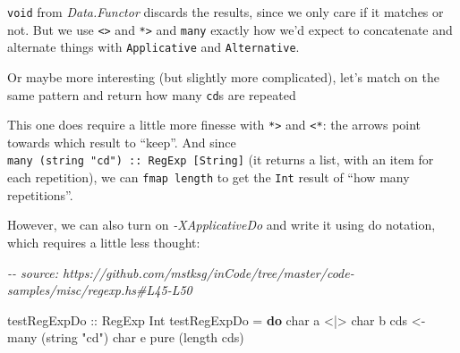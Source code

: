 \documentclass[]{article}
\newenvironment{Shaded}{}{}
\newcommand{\CharTok}[1]{\textcolor[rgb]{0.25,0.44,0.63}{#1}}
\newcommand{\CommentTok}[1]{\textcolor[rgb]{0.38,0.63,0.69}{\textit{#1}}}
\newcommand{\DataTypeTok}[1]{\textcolor[rgb]{0.56,0.13,0.00}{#1}}
\newcommand{\FunctionTok}[1]{\textcolor[rgb]{0.02,0.16,0.49}{#1}}
\newcommand{\KeywordTok}[1]{\textcolor[rgb]{0.00,0.44,0.13}{\textbf{#1}}}
\newcommand{\NormalTok}[1]{#1}
\newcommand{\OperatorTok}[1]{\textcolor[rgb]{0.40,0.40,0.40}{#1}}
\newcommand{\OtherTok}[1]{\textcolor[rgb]{0.00,0.44,0.13}{#1}}
\newcommand{\StringTok}[1]{\textcolor[rgb]{0.25,0.44,0.63}{#1}}
\begin{document}
\texttt{void} from \emph{Data.Functor} discards the results, since we only care
if it matches or not. But we use \texttt{\textless{}\textbar{}\textgreater{}}
and \texttt{*\textgreater{}} and \texttt{many} exactly how we'd expect to
concatenate and alternate things with \texttt{Applicative} and
\texttt{Alternative}.

Or maybe more interesting (but slightly more complicated), let's match on the
same pattern and return how many \texttt{cd}s are repeated

\begin{Shaded}
\end{Shaded}

This one does require a little more finesse with \texttt{*\textgreater{}} and
\texttt{\textless{}*}: the arrows point towards which result to ``keep''. And
since \texttt{many\ (string\ "cd")\ ::\ RegExp\ {[}String{]}} (it returns a
list, with an item for each repetition), we can \texttt{fmap\ length} to get the
\texttt{Int} result of ``how many repetitions''.

However, we can also turn on \emph{-XApplicativeDo} and write it using do
notation, which requires a little less thought:

\begin{Shaded}
\begin{Highlighting}[]
\CommentTok{{-}{-} source: https://github.com/mstksg/inCode/tree/master/code{-}samples/misc/regexp.hs\#L45{-}L50}

\OtherTok{testRegExpDo ::} \DataTypeTok{RegExp} \DataTypeTok{Int}
\NormalTok{testRegExpDo }\OtherTok{=} \KeywordTok{do}
\NormalTok{    char }\CharTok{\textquotesingle{}a\textquotesingle{}} \OperatorTok{\textless{}|\textgreater{}}\NormalTok{ char }\CharTok{\textquotesingle{}b\textquotesingle{}}
\NormalTok{    cds }\OtherTok{\textless{}{-}}\NormalTok{ many (string }\StringTok{"cd"}\NormalTok{)}
\NormalTok{    char }\CharTok{\textquotesingle{}e\textquotesingle{}}
    \FunctionTok{pure}\NormalTok{ (}\FunctionTok{length}\NormalTok{ cds)}
\end{Highlighting}
\end{Shaded}
\end{document}
